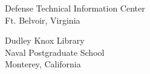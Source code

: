 \documentclass[techreport, article]{npsreport2018}
\begin{document}

%
%



%
%
\NPSend

%
\begin{distributionlist}
\item Defense Technical Information Center\\Ft. Belvoir, Virginia
\item Dudley Knox Library\\Naval Postgraduate School\\Monterey, California
%

\end{distributionlist}
\end{document}
